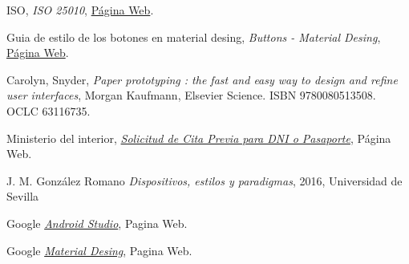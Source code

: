 \documentclass[a4paper,11pt]{article}
\begin{document}
\begin{thebibliography}{99}
ISO,
\textit{ISO 25010},
\href{https://iso25000.com/index.php/normas-iso-25000/iso-25010/23-usabilidad}{Página Web}.

Guia de estilo de los botones en material desing,
\textit{Buttons - Material Desing},
\href{https://material.io/design/components/buttons.html}{Página Web}.


Carolyn, Snyder,
\textit{Paper prototyping : the fast and easy way to design and refine user interfaces},
 Morgan Kaufmann, Elsevier Science. ISBN 9780080513508. OCLC 63116735.


Ministerio del interior,
\href{https://www.citapreviadnie.es/citaPreviaDniExp/}{\textit{Solicitud de Cita Previa para DNI o Pasaporte}}, Página Web.


J. M. González Romano
\textit{Dispositivos, estilos y paradigmas}, 2016, Universidad de Sevilla

Google
\href{https://developer.android.com/studio/}{\textit{Android Studio}}, Pagina Web.

Google
\href{https://material.io/}{\textit{Material Desing}}, Pagina Web.



\end{thebibliography}
\end{document}
